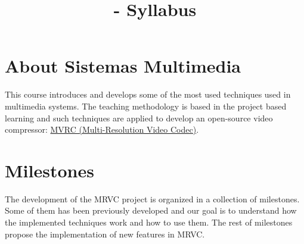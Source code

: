 

\title{\SM{} - Syllabus}

\maketitle

\section{About Sistemas Multimedia}

This course introduces and develops some of the most used techniques
used in multimedia systems. The teaching methodology is based in the
project based learning and such techniques are applied to develop an
open-source video
compressor: \href{https://github.com/Sistemas-Multimedia/MRVC}{MVRC
(Multi-Resolution Video Codec)}.

\section{Milestones}

The development of the MRVC project is organized in a collection of
milestones. Some of them has been previously developed and our goal is
to understand how the implemented techniques work and how to use
them. The rest of milestones propose the implementation of new
features in MRVC.

